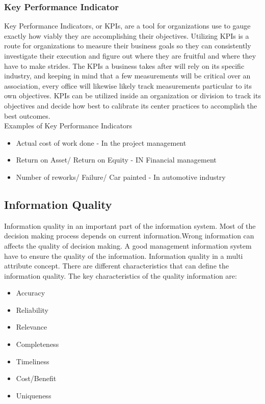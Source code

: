 \subsubsection{Key Performance Indicator}
Key Performance Indicators, or KPIs, are a tool for organizations use to gauge exactly how viably they are accomplishing their objectives. Utilizing KPIs is a route for organizations to measure their business goals so they can consistently investigate their execution and figure out where they are fruitful and where they have to make strides. The KPIs a business takes after will rely on its specific industry, and keeping in mind that a few measurements will be critical over an association, every office will likewise likely track measurements particular to its own objectives.
KPIs can be utilized inside an organization or division to track its objectives and decide how best to calibrate its center practices to accomplish the best outcomes. \\

Examples of Key Performance Indicators 
\begin{itemize}
\item Actual cost of work done - In the project management 
\item Return on Asset/ Return on Equity - IN Financial management
\item Number of reworks/ Failure/ Car painted - In automotive industry
\end{itemize}

\subsection{Information Quality}
Information quality in an important part of the information system. Most of the decision making process depends on current information.Wrong information can affects the quality of decision making. A good management information system have to ensure the quality of the information. Information quality in a multi attribute concept. There are different characteristics that can define the information quality. The key characteristics of the quality information are:
\begin{itemize}
\item Accuracy
\item Reliability
\item Relevance
\item Completeness
\item Timeliness
\item Cost/Benefit
\item Uniqueness
\end{itemize}


